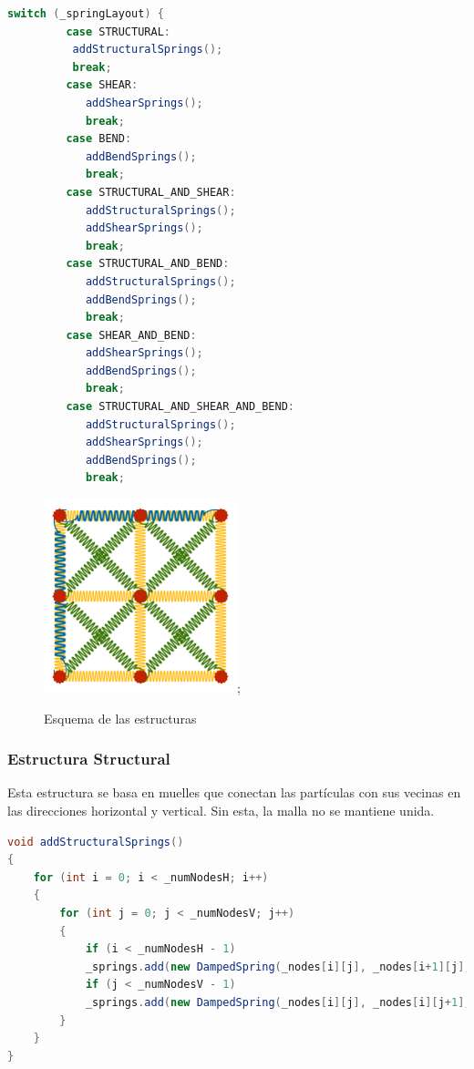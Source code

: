 \documentclass{article}
\begin{document}
\begin{lstlisting}[language=Java, frame=single]
    switch (_springLayout) {
         case STRUCTURAL:
          addStructuralSprings();
          break;
         case SHEAR:
            addShearSprings();
            break;
         case BEND:
            addBendSprings();
            break;
         case STRUCTURAL_AND_SHEAR:
            addStructuralSprings();
            addShearSprings();
            break;
         case STRUCTURAL_AND_BEND:
            addStructuralSprings();
            addBendSprings();
            break;
         case SHEAR_AND_BEND:
            addShearSprings();
            addBendSprings();
            break;
         case STRUCTURAL_AND_SHEAR_AND_BEND:
            addStructuralSprings();
            addShearSprings();
            addBendSprings();
            break;   
\end{lstlisting}

\begin{figure}[H]
    \centering
    \includegraphics[width=0.5\textwidth]{img/structures.png};
    \caption{Esquema de las estructuras}
    \label{fig:structures}

\end{figure}

\subsubsection{Estructura Structural}\label{sec:estructura-estructural}
Esta estructura se basa en muelles que conectan las partículas con sus vecinas en las direcciones horizontal y vertical. Sin esta, la malla no se mantiene unida.
\begin{lstlisting}[language=Java, frame=single]
void addStructuralSprings()
{
    for (int i = 0; i < _numNodesH; i++)
    {
        for (int j = 0; j < _numNodesV; j++)
        {
            if (i < _numNodesH - 1)
            _springs.add(new DampedSpring(_nodes[i][j], _nodes[i+1][j], Ke, Kd));
            if (j < _numNodesV - 1)
            _springs.add(new DampedSpring(_nodes[i][j], _nodes[i][j+1], Ke, Kd));
        }
    }
}
\end{lstlisting}
\end{document}
